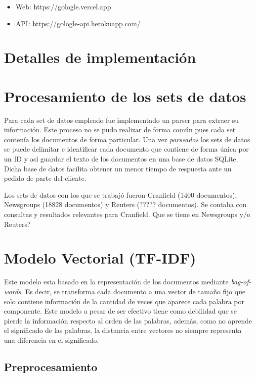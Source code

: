 \documentclass[12pt]{llncs}
\begin{document}
\begin{itemize}
  \item Web: https://gologle.vercel.app
  \item API: https://gologle-api.herokuapp.com/
\end{itemize}

\section*{Detalles de implementación}

\section{Procesamiento de los sets de datos}

Para cada set de datos empleado fue implementado un parser para extraer su información. Este proceso no se pudo realizar de forma común pues cada set contenía los documentos de forma particular. Una vez \textit{parseados} los sets de datos se puede delimitar e identificar cada documento que contiene de forma única por un ID y así guardar el texto de los documentos en una base de datos SQLite. Dicha base de datos facilita obtener un menor tiempo de respuesta ante un pedido de parte del cliente.

Los sets de datos con los que se trabajó fueron Cranfield (1400 documentos), Newsgroups (18828 documentos) y Reuters (????? documentos). Se contaba con consultas y resultados relevantes para Cranfield. {\color{red}Que se tiene en Newsgroups y/o Reuters?}

\section{Modelo Vectorial (TF-IDF)}

Este modelo esta basado en la representación de los documentos mediante \textit{bag-of-words}. Es decir, se transforma cada documento a una vector de tamaño fijo que solo contiene información de la cantidad de veces que aparece cada palabra por componente. Este modelo a pesar de ser efectivo tiene como debilidad que se pierde la información respecto al orden de las palabras, además, como no aprende el significado de las palabras, la distancia entre vectores no siempre representa una diferencia en el significado. 

\subsection{Preprocesamiento}
\end{document}
